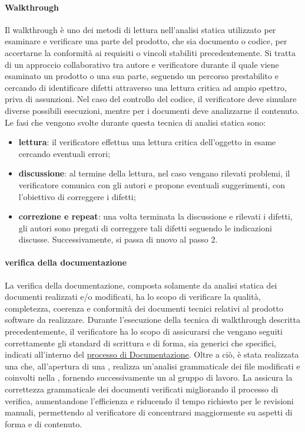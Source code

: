 \paragraph{Walkthrough}
Il walkthrough è uno dei metodi di lettura nell'analisi statica utilizzato per esaminare e verificare una parte del prodotto, che sia documento o codice, per accertarne la conformità ai requisiti o vincoli stabiliti precedentemente.
Si tratta di un approccio collaborativo tra autore e verificatore durante il quale viene esaminato un prodotto o una sua parte, seguendo un percorso prestabilito e cercando di identificare difetti attraverso una lettura critica ad ampio spettro, priva di assunzioni.
Nel caso del controllo del codice, il verificatore deve simulare diverse possibili esecuzioni, mentre per i documenti deve analizzarne il contenuto.
Le fasi che vengono svolte durante questa tecnica di analisi statica sono:
\begin{itemize}
    \item \textbf{lettura}: il verificatore effettua una lettura critica dell'oggetto in esame cercando eventuali errori;
    \item \textbf{discussione}: al termine della lettura, nel caso vengano rilevati problemi, il verificatore comunica con gli autori e propone eventuali suggerimenti, con l'obiettivo di correggere i difetti;
    \item \textbf{correzione e repeat}: una volta terminata la discussione e rilevati i difetti, gli autori sono pregati di correggere tali difetti seguendo le indicazioni discusse. Successivamente, si passa di nuovo al passo 2.
\end{itemize}
\paragraph{verifica della documentazione}
La verifica della documentazione, composta solamente da analisi statica dei documenti realizzati e/o modificati, ha lo scopo di verificare
la qualità, completezza, coerenza e conformità dei documenti tecnici relativi al prodotto software da realizzare.
Durante l'esecuzione della tecnica di walkthrough descritta precedentemente, il verificatore ha lo scopo di 
assicurarsi che vengano seguiti correttamente gli standard di scrittura e di forma, sia generici che specifici, indicati all'interno
del \hyperref[subsec:documentazione]{processo di Documentazione}.
Oltre a ciò, è stata realizzata una  che, all'apertura di una , realizza un'analisi grammaticale dei file 
modificati e coinvolti nella , fornendo successivamente un  al gruppo di lavoro.
La  assicura la correttezza grammaticale dei documenti verificati migliorando il processo di verifica, aumentandone l'efficienza 
e riducendo il tempo richiesto per le revisioni manuali, permettendo al verificatore di concentrarsi maggiormente su aspetti 
di forma e di contenuto.
